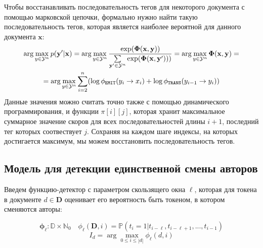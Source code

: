 Чтобы восстанавливать последовательность тегов для некоторого документа с помощью марковской цепочки, формально нужно найти такую последовательность тегов, которая является наиболее вероятной для данного документа $\mathbf{x}$:
\begin{multline*}
\arg\max\limits_{y \in \mathcal{Y}^{n}} p(\mathbf{y}'|\mathbf{x}) = \arg\max\limits_{y \in \mathcal{Y}^{n}} \frac{\exp(\mathbf{\Phi}(\mathbf{x}, \mathbf{y}))}{\sum\limits_{\mathbf{y}' \in \mathcal{Y}^n} \exp(\mathbf{\Phi}(\mathbf{x}, \mathbf{y'})))} = \arg\max\limits_{y \in \mathcal{Y}^n} \mathbf{\Phi}(\mathbf{x}, \mathbf{y}) = 
\cr =\arg\max\limits_{y \in \mathcal{Y}^n} \sum\limits_{i = 2}^{n} (\log \phi_{\texttt{EMIT}} (y_i \rightarrow x_i) + \log \phi_{\texttt{TRANS}} (y_{i - 1} \rightarrow y_i))
\end{multline*}
Данные значения можно считать точно также с помощью динамического программирования, и функции $\pi[i][j]$, которая хранит максимальное суммарное значение скоров для всех последовательностей длины $i + 1$, последний тег которых соотвествует $j$. Сохраняя на каждом шаге индексы, на которых достигается максимум, мы можем восстановить последовательность тегов.


\subsection{Модель для детекции единственной смены авторов}

Введем функцию-детектор с параметром скользящего окна $\ell$, которая для токена в документе $d \in \mathbf{D}$ оценивает его вероятность быть токеном, в котором сменяются авторы:

\begin{equation}
    \mathbf \phi_{\ell} : \mathbb{D} \times \mathbb{N}_0 \quad \phi_{\ell}(\mathbf{D}, i) = \mathbb{P}(t_{i} = 1 | t_{i - \ell}, t_{i - \ell + 1}, ..., t_{i- 1})
\end{equation}
\begin{equation}
I_d = \arg \max_{0 \leq i \leq |d|} \phi_{\ell}(d, i)
\end{equation}
